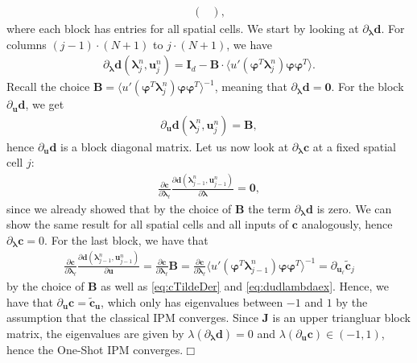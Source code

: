 \documentclass[10pt, a4paper, titlepage, bibliography=totocnumbered]{article}
\newenvironment{proof}[1][Proof]{\begin{trivlist}
\item[\hskip \labelsep {\bfseries #1}]}{\end{trivlist}}
\newcommand{\qed}{\hfill \ensuremath{\Box}}
\begin{document}
\begin{proof}
\begin{align*}
\begin{pmatrix}
\end{pmatrix},
\end{align*}
where each block has entries for all spatial cells. We start by looking at $\partial_{\bm{\lambda}} \bm{d}$. For columns $(j-1)\cdot(N+1)$ to $j\cdot(N+1)$, we have
\begin{align*}
\partial_{\bm{\lambda}} \bm{d}(\bm{\lambda}_j^n,\bm{u}_j^n) = \bm{I}_d - \bm{B} \cdot \langle u'(\bm{\varphi}^T\bm{\lambda}_j^n)\bm{\varphi}\bm{\varphi}^T \rangle.
\end{align*}
Recall the choice $\bm{B} = \langle u'(\bm{\varphi}^T\bm{\lambda}_j^n)\bm{\varphi}\bm{\varphi}^T \rangle^{-1}$, meaning that $\partial_{\bm{\lambda}} \bm{d} = \bm{0}$. For the block $\partial_{\bm{u}} \bm{d}$, we get 
\begin{align*}
\partial_{\bm{u}} \bm{d}(\bm{\lambda}_j^n,\bm{u}_j^n) = \bm{B},
\end{align*}
hence $\partial_{\bm{u}} \bm{d}$ is a block diagonal matrix. Let us now look at $\partial_{\bm{\lambda}} \bm{c}$ at a fixed spatial cell $j$:
\begin{align*}
\frac{\partial \bm{c}}{\partial \bm{\lambda}_{\ell}}\frac{\partial \bm{d}(\bm{\lambda}_{j-1}^{n},\bm{u}_{j-1}^{n})}{\partial \bm{\lambda}} = \bm{0},
\end{align*}
since we already showed that by the choice of $\bm{B}$ the term $\partial_{\bm{\lambda}} \bm{d}$ is zero. We can show the same result for all spatial cells and all inputs of $\bm{c}$ analogously, hence $\partial_{\bm{\lambda}} \bm{c} = 0$. For the last block, we have that 
\begin{align*}
\frac{\partial \bm{c}}{\partial \bm{\lambda}_{\ell}}\frac{\partial \bm{d}(\bm{\lambda}_{j-1}^{n},\bm{u}_{j-1}^{n})}{\partial \bm{u}} = \frac{\partial \bm{c}}{\partial \bm{\lambda}_{\ell}} \bm{B} = \frac{\partial \bm{c}}{\partial \bm{\lambda}_{\ell}} \langle u'(\bm{\varphi}^T\bm{\lambda}_{j-1}^n)\bm{\varphi}\bm{\varphi}^T \rangle^{-1} = \partial_{\bm{u}_{\ell}}\bm{\tilde c}_j
\end{align*}
by the choice of $\bm{B}$ as well as \eqref{eq:cTildeDer} and \eqref{eq:dudlambdaex}. Hence, we have that $\partial_{\bm{u}} \bm{c} = \bm{\tilde c}_{\bm{u}}$, which only has eigenvalues between $-1$ and $1$ by the assumption that the classical IPM converges. Since $\bm{J}$ is an upper triangluar block matrix, the eigenvalues are given by $\lambda\left(\partial_{\bm{\lambda}} \bm{d}\right) = 0$ and $\lambda\left(\partial_{\bm{u}} \bm{c}\right)\in(-1,1)$, hence the One-Shot IPM converges.\qed
\end{proof}
\end{document}
